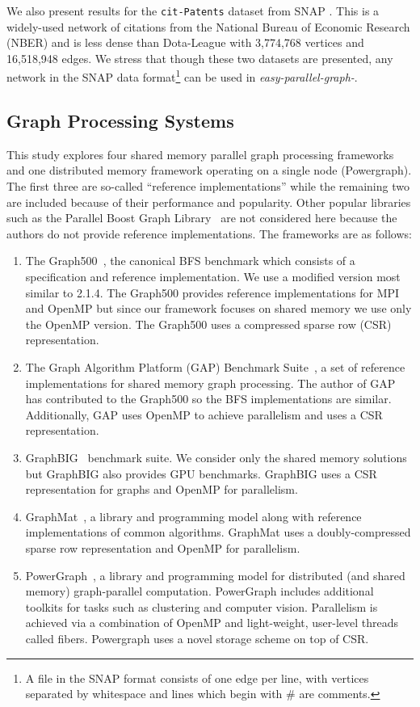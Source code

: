 \documentclass[conference]{IEEEtran}
\begin{document}
We also present results for the \verb|cit-Patents| dataset from SNAP \cite{snap-cit-patents}. This is a widely-used network of citations from the National Bureau of Economic Research (NBER) and is less dense than Dota-League with 3,774,768 vertices and 16,518,948 edges. We stress that though these two datasets are presented, any network in the SNAP data format\footnote{A file in the SNAP format consists of one edge per line, with vertices separated by whitespace and lines which begin with \# are comments.} can be used in \mbox{\emph{easy-parallel-graph-\textasteriskcentered}}.

\subsection{Graph Processing Systems}

This study explores four shared memory parallel graph processing frameworks and one distributed memory framework operating on a single node (Powergraph). The first three are so-called ``reference implementations'' while the remaining two are included because of their performance and popularity. Other popular libraries such as the Parallel Boost Graph Library~\cite{Gregor:2005:PBGL} are not considered here because the authors do not provide reference implementations. The frameworks are as follows:
\begin{enumerate}
	\item The Graph500~\cite{Murphy:2010:Graph500}, the canonical BFS benchmark which consists of a specification and reference implementation. We use a modified version most similar to 2.1.4. The Graph500 provides reference implementations for MPI and OpenMP but since our framework focuses on shared memory we use only the OpenMP version. The Graph500 uses a compressed sparse row (CSR) representation.
	\item The Graph Algorithm Platform (GAP) Benchmark Suite~\cite{Beamer:2015:GAPBench}, a set of reference implementations for shared memory graph processing. The author of GAP has contributed to the Graph500 so the BFS implementations are similar. Additionally, GAP uses OpenMP to achieve parallelism and uses a CSR representation.
	\item GraphBIG~\cite{Nai:2015:Graphbig} benchmark suite. We consider only the shared memory solutions but GraphBIG also provides GPU benchmarks. GraphBIG uses a CSR representation for graphs and OpenMP for parallelism.
	\item GraphMat~\cite{Sundaram:2015:GraphMat}, a library and programming model along with reference implementations of common algorithms. GraphMat uses a doubly-compressed sparse row representation and OpenMP for parallelism.
	\item PowerGraph~\cite{Gonzalez:2012:Powergraph}, a library and programming model for distributed (and shared memory) graph-parallel computation. PowerGraph includes additional toolkits for tasks such as clustering and computer vision. Parallelism is achieved via a combination of OpenMP and light-weight, user-level threads called fibers. Powergraph uses a novel storage scheme on top of CSR.
\end{enumerate}
\end{document}
